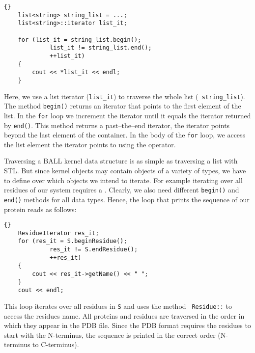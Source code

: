 \begin{lstlisting}{}
	list<string> string_list = ...;
	list<string>::iterator list_it;
	
	for (list_it = string_list.begin(); 
			 list_it != string_list.end();
			 ++list_it)
	{
		cout << *list_it << endl;
	}
\end{lstlisting}

\noindent
Here, we use a list iterator ({\tt list\_it}) to traverse the whole list ({\tt
string\_list}). The method {\tt begin()} returns an iterator that points to
the first element of the list. In the {\tt for} loop we increment the iterator
until it equals the iterator returned by {\tt end()}. This method returns a
past--the--end iterator, \ie the iterator points beyond the last element of
the container. In the body of the {\tt for} loop, we access the list element
the iterator points to using the {\tt *} operator.

Traversing a BALL kernel data structure is as simple as traversing a list with
STL. But since kernel objects may contain objects of a variety of types,
we have to define over which objects we intend to iterate.
For example iterating over all residues of our system requires a
. Clearly, we also need different {\tt begin()} and
{\tt end()} methods for all data types. Hence, the loop that prints the
sequence of our protein reads as follows:

\begin{lstlisting}{}
	ResidueIterator res_it;
	for (res_it = S.beginResidue(); 
			 res_it != S.endResidue();
			 ++res_it)
	{
		cout << res_it->getName() << " ";
	}
	cout << endl;
\end{lstlisting}

\noindent
This loop iterates over all residues in {\tt S} and uses the method {\tt
Residue::} to access the residues name. All proteins and
residues are traversed in the order in which they appear in the PDB file.
Since the PDB format requires the residues to start with the N-terminus,
the sequence is printed  in the correct order (N-terminus to C-terminus).

